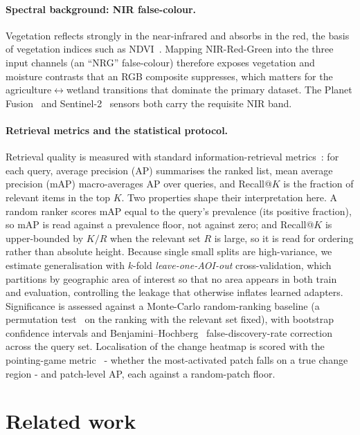 \documentclass{article}
\begin{document}
\paragraph{Spectral background: NIR false-colour.}
Vegetation reflects strongly in the near-infrared and absorbs in the red, the
basis of vegetation indices such as NDVI~\cite{vegindex}. Mapping
NIR-Red-Green into the three input channels (an ``NRG'' false-colour) therefore
exposes vegetation and moisture contrasts that an RGB composite suppresses,
which matters for the agriculture$\leftrightarrow$wetland transitions that
dominate the primary dataset. The Planet Fusion~\cite{planetfusion} and
Sentinel-2~\cite{sentinel2} sensors both carry the requisite NIR band.

\paragraph{Retrieval metrics and the statistical protocol.}
Retrieval quality is measured with standard information-retrieval
metrics~\cite{irmetrics}: for each query, average precision (AP) summarises the
ranked list, mean average precision (mAP) macro-averages AP over queries, and
Recall@$K$ is the fraction of relevant items in the top $K$. Two properties
shape their interpretation here. A random ranker scores mAP equal to the query's
prevalence (its positive fraction), so mAP is read against a prevalence floor,
not against zero; and Recall@$K$ is upper-bounded by $K/R$ when the relevant set
$R$ is large, so it is read for ordering rather than absolute height. Because
single small splits are high-variance, we estimate generalisation with $k$-fold
\emph{leave-one-AOI-out} cross-validation, which partitions by geographic area
of interest so that no area appears in both train and evaluation, controlling
the leakage that otherwise inflates learned adapters. Significance is assessed
against a Monte-Carlo random-ranking baseline (a permutation test~\cite{permtest}
on the ranking with the relevant set fixed), with bootstrap~\cite{bootstrap}
confidence intervals and
Benjamini--Hochberg~\cite{benjaminihochberg} false-discovery-rate correction
across the query set. Localisation of the change heatmap is scored with the
pointing-game metric~\cite{pointinggame} - whether the most-activated patch
falls on a true change region - and patch-level AP, each against a random-patch
floor.


\section{Related work}
\label{sec:related}
\end{document}
